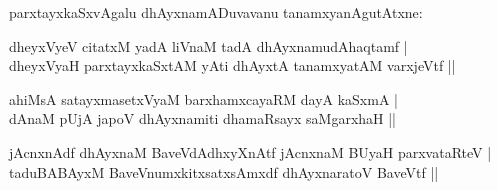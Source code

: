 \begin{entry}
{{parxtayxkaSxvAgalu dhAyxnamADuvavanu tanamxyanAgutAtxne:}}
\medskip
\begin{shl}
dheyxVyeV citatxM yadA liVnaM tadA dhAyxnamudAhaqtamf |\\[1pt]
dheyxVyaH parxtayxkaSxtAM yAti dhAyxtA tanamxyatAM varxjeVtf ||
\end{shl}
\medskip
{}
\medskip
{}
\medskip
\begin{shl}
ahiMsA satayxmasetxVyaM barxhamxcayaRM dayA kaSxmA |\\[1pt]
dAnaM pUjA japoV dhAyxnamiti dhamaRsayx saMgarxhaH ||
\end{shl}
\medskip
{}
\medskip
{}
\medskip
\begin{shl}
jAcnxnAdf dhAyxnaM BaveVdAdhxyXnAtf jAcnxnaM BUyaH parxvataRteV |\\[1pt]
taduBABAyxM BaveVnumxkitxsatxsAmxdf dhAyxnaratoV BaveVtf ||
\end{shl}
\medskip
{}
\medskip
\end{entry}

